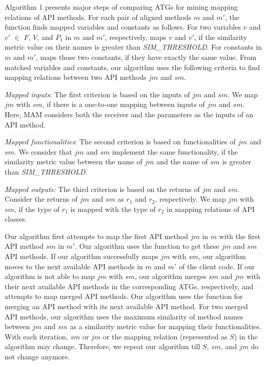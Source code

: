 Algorithm 1 presents major steps of comparing ATGs for mining
mapping relations of API methods. For each pair of aligned methods $m$ and $m'$, the  function finds mapped variables and constants as follows. For two variables $v$ and $v'$ $\in$ $F$, $V$, and $P_1$ in $m$ and $m'$, respectively,
 maps $v$ and $v'$, if the similarity metric value on their names is greater
than \emph{SIM\_THRESHOLD}. For constants in $m$ and $m'$, 
maps those two constants, if they have exactly the same
value. From matched variables and constants, our algorithm uses the following criteria to find mapping relations between two API methods $jm$ and $sm$.

\emph{Mapped inputs}: The first criterion is based on the inputs
of $jm$ and $sm$. We map $jm$ with $sm$, if there is a one-to-one
mapping between inputs of $jm$ and $sm$. Here, MAM
considers both the receiver and the parameters as the inputs of an
API method.

\emph{Mapped functionalities}: The second criterion is based on functionalities of
$jm$ and $sm$. We consider that $jm$ and $sm$ implement the same functionality,
if the similarity metric value between the name of $jm$ and the name of $sm$ is
greater than \emph{SIM\_THRESHOLD}.

\emph{Mapped outputs:} The third criterion is based on the returns of $jm$ and $sm$.
Consider the returns of $jm$ and $sm$ as $r_1$ and $r_2$, respectively. We map $jm$
with $sm$, if the type of $r_1$ is mapped with the type of $r_2$ in
mapping relations of API classes.

Our algorithm first attempts to map the first API method $jm$ in $m$
with the first API method $sm$ in $m'$. Our algorithm uses the 
function to get these $jm$ and $sm$ API methods. If our algorithm successfully maps $jm$ with
$sm$, our algorithm moves to the next available API methods in $m$
and $m'$ of the client code. If our algorithm is not able to map $jm$
with $sm$, our algorithm merges $sm$ and $jm$ with their next available API methods
in the corresponding ATGs, respectively, and attempts to map merged API methods.
Our algorithm uses the  function for merging an API method with its
next available API method. For two merged API methods, our algorithm uses the
maximum similarity of method names between $jm$ and $sm$ as a
similarity metric value for mapping their functionalities.
With each iteration, $sm$ or $jm$ or the mapping relation (represented as $S$)
in the algorithm may change. Therefore, we repeat our algorithm
till $S$, $sm$, and $jm$ do not change anymore.

